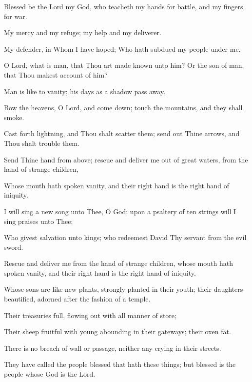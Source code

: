 Blessed be the Lord my God, who teacheth my hands for battle, and my fingers for war.

My mercy and my refuge; my help and my deliverer.

My defender, in Whom I have hoped; Who hath subdued my people under me.

O Lord, what is man, that Thou art made known unto him? Or the son of man, that Thou makest account of him?

Man is like to vanity; his days as a shadow pass away.

Bow the heavens, O Lord, and come down; touch the mountains, and they shall smoke.

Cast forth lightning, and Thou shalt scatter them; send out Thine arrows, and Thou shalt trouble them.

Send Thine hand from above; rescue and deliver me out of great waters, from the hand of strange children,

Whose mouth hath spoken vanity, and their right hand is the right hand of iniquity.

I will sing a new song unto Thee, O God; upon a psaltery of ten strings will I sing praises unto Thee;

Who givest salvation unto kings; who redeemest David Thy servant from the evil sword.

Rescue and deliver me from the hand of strange children, whose mouth hath spoken vanity, and their right hand is the right hand of iniquity.

Whose sons are like new plants, strongly planted in their youth; their daughters beautified, adorned after the fashion of a temple.

Their treasuries full, flowing out with all manner of store;

Their sheep fruitful with young abounding in their gateways; their oxen fat.

There is no breach of wall or passage, neither any crying in their streets.

They have called the people blessed that hath these things; but blessed is the people whose God is the Lord.
